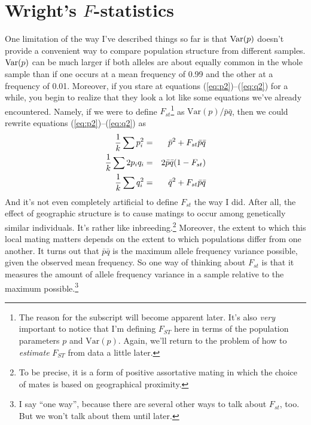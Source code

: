 \section*{Wright's $F$-statistics}

One limitation of the way I've described things so far is that
$\hbox{Var}(p)$ doesn't provide a convenient way to compare population
structure from different samples. $\hbox{Var}(p)$ can be much larger
if both alleles are about equally common in the whole sample than if
one occurs at a mean frequency of 0.99 and the other at a frequency of
0.01. Moreover, if you stare at equations (\ref{eq:p2})--(\ref{eq:q2})
for a while, you begin to realize that they look a lot like some
equations we've already encountered. Namely, if we were to define
$F_{st}$\footnote{The reason for the subscript will become apparent
  later. It's also {\it very\/} important to notice that I'm defining
  $F_{ST}$ here in terms of the population parameters $p$ and
  $\mbox{Var}(p)$. Again, we'll return to the problem of how to {\it
    estimate\/} $F_{ST}$ from data a little later.} as
$\mbox{Var}(p)/\bar p\bar q$, then we could rewrite equations
(\ref{eq:p2})--(\ref{eq:q2}) as
\begin{eqnarray}
\frac{1}{k}\sum p_i^2 &=& \bar p^2 + F_{st}\bar p \bar q \label{eq:p2-f} \\
\frac{1}{k}\sum 2p_iq_i &=& 2\bar p\bar q(1 - F_{st}) \label{eq:2pq-f} \\
\frac{1}{k}\sum q_i^2   &=& \bar q^2 + F_{st}\bar p \bar q \label{eq:q2-f}
\end{eqnarray}
And it's not even completely artificial to define $F_{st}$ the way I
did. After all, the effect of geographic structure is to cause matings
to occur among genetically similar individuals. It's rather like
inbreeding.\footnote{To be precise, it is a form of positive
  assortative mating in which the choice of mates is based on
  geographical proximity.}  Moreover, the extent to which this local
mating matters depends on the extent to which populations differ from
one another. It turns out that $\bar p\bar q$ is the maximum allele
frequency variance possible, given the observed mean frequency. So one
way of thinking about $F_{st}$ is that it measures the amount of
allele frequency variance in a sample relative to the maximum
possible.\footnote{I say ``one way'', because there are several other
  ways to talk about $F_{st}$, too. But we won't talk about them until
  later.}

